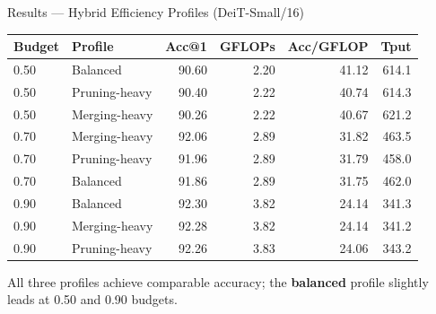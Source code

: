 \documentclass[aspectratio=169, 11pt]{beamer}
\begin{document}
\begin{frame}{Results — Hybrid Efficiency Profiles (DeiT-Small/16)}
\begin{table}[h]
\centering
\small
\begin{tabular}{@{}llrrrr@{}}
\toprule
\textbf{Budget} & \textbf{Profile} & \textbf{Acc@1} & \textbf{GFLOPs} & \textbf{Acc/GFLOP} & \textbf{Tput} \\
\midrule
0.50 & Balanced       & 90.60 & 2.20 & 41.12 & 614.1 \\
0.50 & Pruning-heavy  & 90.40 & 2.22 & 40.74 & 614.3 \\
0.50 & Merging-heavy  & 90.26 & 2.22 & 40.67 & 621.2 \\
\midrule
0.70 & Merging-heavy  & 92.06 & 2.89 & 31.82 & 463.5 \\
0.70 & Pruning-heavy  & 91.96 & 2.89 & 31.79 & 458.0 \\
0.70 & Balanced       & 91.86 & 2.89 & 31.75 & 462.0 \\
\midrule
0.90 & Balanced       & 92.30 & 3.82 & 24.14 & 341.3 \\
0.90 & Merging-heavy  & 92.28 & 3.82 & 24.14 & 341.2 \\
0.90 & Pruning-heavy  & 92.26 & 3.83 & 24.06 & 343.2 \\
\bottomrule
\end{tabular}
\end{table}
\vspace{0.2cm}
All three profiles achieve comparable accuracy; the \textbf{balanced} profile slightly leads at 0.50 and 0.90 budgets.
\end{frame}
\end{document}
